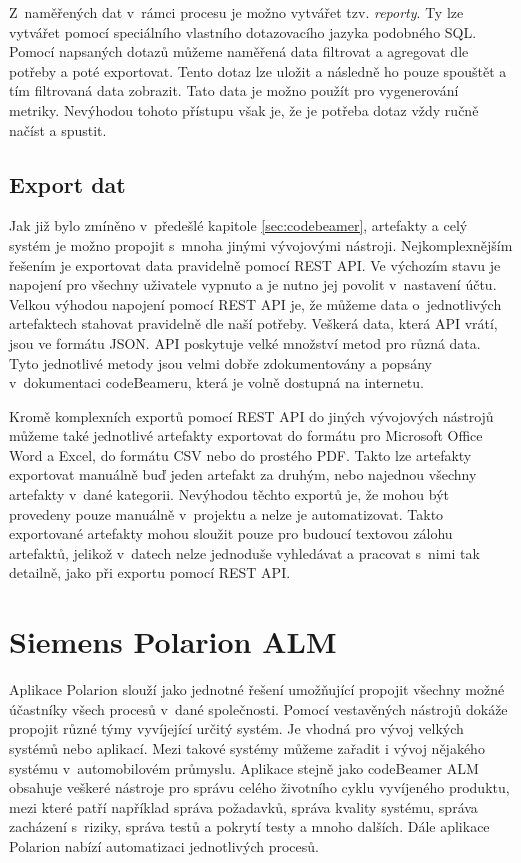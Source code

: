 \documentclass[czech,master]{diploma}
\begin{document}
Z~naměřených dat v~rámci procesu je možno vytvářet tzv. \textit{reporty}. Ty lze vytvářet pomocí speciálního vlastního dotazovacího jazyka podobného SQL. Pomocí napsaných dotazů můžeme naměřená data filtrovat a agregovat dle potřeby a poté exportovat. Tento dotaz lze uložit a následně ho pouze spouštět a tím filtrovaná data zobrazit. Tato data je možno použít pro vygenerování metriky. Nevýhodou tohoto přístupu však je, že je potřeba dotaz vždy ručně načíst a spustit.

\subsection{Export dat}
Jak již bylo zmíněno v~předešlé kapitole \ref{sec:codebeamer}, artefakty a celý systém je možno propojit s~mnoha jinými vývojovými nástroji. Nejkomplexnějším řešením je exportovat data pravidelně pomocí REST API. Ve výchozím stavu je napojení pro všechny uživatele vypnuto a je nutno jej povolit v~nastavení účtu. Velkou výhodou napojení pomocí REST API je, že můžeme data o~jednotlivých artefaktech stahovat pravidelně dle naší potřeby. Veškerá data, která API vrátí, jsou ve formátu JSON. API poskytuje velké množství metod pro různá data. Tyto jednotlivé metody jsou velmi dobře zdokumentovány a popsány v~dokumentaci codeBeameru, která je volně dostupná na internetu.  \cite{ref:codebeamer_rest}

Kromě komplexních exportů pomocí REST API do jiných vývojových nástrojů můžeme také jednotlivé artefakty exportovat do formátu pro Microsoft Office Word a Excel, do formátu CSV nebo do prostého PDF. Takto lze artefakty exportovat manuálně buď jeden artefakt za druhým, nebo najednou všechny artefakty v~dané kategorii. Nevýhodou těchto exportů je, že mohou být provedeny pouze manuálně v~projektu a nelze je automatizovat. Takto exportované artefakty mohou sloužit pouze pro budoucí textovou zálohu artefaktů, jelikož v~datech nelze jednoduše vyhledávat a pracovat s~nimi tak detailně, jako při exportu pomocí REST API.


\section{Siemens Polarion ALM}
Aplikace Polarion slouží jako jednotné řešení umožňující propojit všechny možné účastníky všech procesů v~dané společnosti. Pomocí vestavěných nástrojů dokáže propojit různé týmy vyvíjející určitý systém. Je vhodná pro vývoj velkých systémů nebo aplikací. Mezi takové systémy můžeme zařadit i vývoj nějakého systému v~automobilovém průmyslu. Aplikace stejně jako codeBeamer ALM obsahuje veškeré nástroje pro správu celého životního cyklu vyvíjeného produktu, mezi které patří například správa požadavků, správa kvality systému, správa zacházení s~riziky, správa testů a pokrytí testy a mnoho dalších. Dále aplikace Polarion nabízí automatizaci jednotlivých procesů. \cite{ref:polarion_about}
\end{document}
